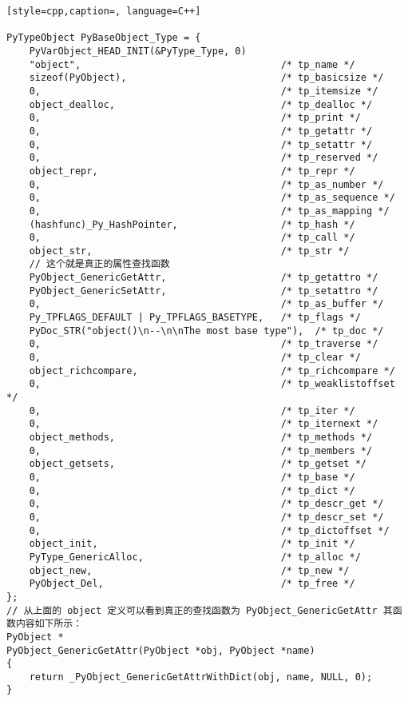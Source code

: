 \begin{lstlisting}[style=cpp,caption=, language=C++]

PyTypeObject PyBaseObject_Type = {
    PyVarObject_HEAD_INIT(&PyType_Type, 0)
    "object",                                   /* tp_name */
    sizeof(PyObject),                           /* tp_basicsize */
    0,                                          /* tp_itemsize */
    object_dealloc,                             /* tp_dealloc */
    0,                                          /* tp_print */
    0,                                          /* tp_getattr */
    0,                                          /* tp_setattr */
    0,                                          /* tp_reserved */
    object_repr,                                /* tp_repr */
    0,                                          /* tp_as_number */
    0,                                          /* tp_as_sequence */
    0,                                          /* tp_as_mapping */
    (hashfunc)_Py_HashPointer,                  /* tp_hash */
    0,                                          /* tp_call */
    object_str,                                 /* tp_str */
    // 这个就是真正的属性查找函数
    PyObject_GenericGetAttr,                    /* tp_getattro */
    PyObject_GenericSetAttr,                    /* tp_setattro */
    0,                                          /* tp_as_buffer */
    Py_TPFLAGS_DEFAULT | Py_TPFLAGS_BASETYPE,   /* tp_flags */
    PyDoc_STR("object()\n--\n\nThe most base type"),  /* tp_doc */
    0,                                          /* tp_traverse */
    0,                                          /* tp_clear */
    object_richcompare,                         /* tp_richcompare */
    0,                                          /* tp_weaklistoffset */
    0,                                          /* tp_iter */
    0,                                          /* tp_iternext */
    object_methods,                             /* tp_methods */
    0,                                          /* tp_members */
    object_getsets,                             /* tp_getset */
    0,                                          /* tp_base */
    0,                                          /* tp_dict */
    0,                                          /* tp_descr_get */
    0,                                          /* tp_descr_set */
    0,                                          /* tp_dictoffset */
    object_init,                                /* tp_init */
    PyType_GenericAlloc,                        /* tp_alloc */
    object_new,                                 /* tp_new */
    PyObject_Del,                               /* tp_free */
};
// 从上面的 object 定义可以看到真正的查找函数为 PyObject_GenericGetAttr 其函数内容如下所示：
PyObject *
PyObject_GenericGetAttr(PyObject *obj, PyObject *name)
{
    return _PyObject_GenericGetAttrWithDict(obj, name, NULL, 0);
}
\end{lstlisting}

